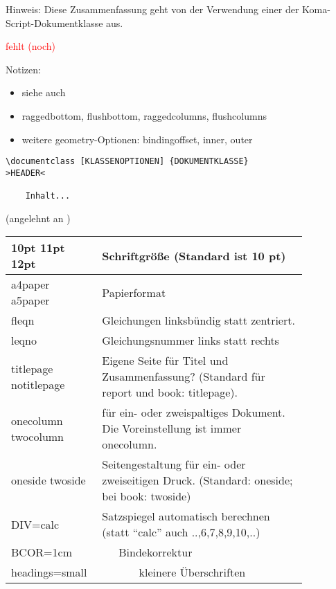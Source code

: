 \pagebreak

\label{cha:DokFormatierung}
Hinweis: Diese Zusammenfassung geht von der Verwendung einer der Koma-Script-Dokumentklasse aus.

\label{cha:Seitenlayout}
\textcolor{red}{fehlt (noch)}

\noindent Notizen:
\begin{itemize}
	\item siehe auch 
	\item raggedbottom, flushbottom, raggedcolumns, flushcolumns
	\item weitere geometry-Optionen: bindingoffset, inner, outer
\end{itemize}

\notizenplatz\notizenplatz

\begin{lstlisting}
\documentclass [KLASSENOPTIONEN] {DOKUMENTKLASSE}
>HEADER<

	Inhalt...

\end{lstlisting}

(angelehnt an \cite[S.\,9]{l2kurz}) \newline
\begin{tabular}{L{0.2\linewidth}L{0.65\linewidth}}
\toprule
	10pt 11pt 12pt
	& Schriftgröße (Standard ist 10 pt)
	\\ \midrule
	a4paper a5paper
	& Papierformat
	\\ \midrule
	fleqn
	& Gleichungen linksbündig statt zentriert.
	\\ \midrule
	leqno
	& Gleichungsnummer links statt rechts
	\\ \midrule
	titlepage
	notitlepage
	& Eigene Seite für Titel und Zusammenfassung? (Standard für report und book: titlepage).
	\\ \midrule
onecolumn \linebreak
twocolumn
& für ein- oder zweispaltiges Dokument. Die Voreinstellung ist immer onecolumn.
	\\ \midrule
oneside \linebreak
twoside
& Seitengestaltung für ein- oder zweiseitigen Druck. (Standard: oneside; bei book: twoside)
\\ \midrule
DIV=calc	& Satzspiegel automatisch berechnen (statt ``calc'' auch ..,6,7,8,9,10,..)
\\ \midrule
BCOR=1cm	&~~~Bindekorrektur
\\ \midrule
headings=small &~~~~~~ kleinere Überschriften
\\ \bottomrule
\end{tabular}


